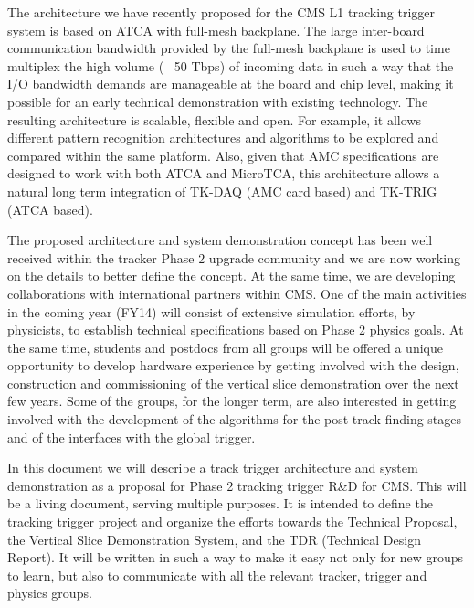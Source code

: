 \noindent The architecture we have recently proposed for the CMS L1 tracking trigger system is based on ATCA with full-mesh backplane. The large inter-board communication bandwidth provided by the full-mesh backplane is used to time multiplex the high volume (~ 50 Tbps) of incoming data in such a way that the I/O bandwidth demands are manageable at the board and chip level, making it possible for an early technical demonstration with existing technology. The resulting architecture is scalable, flexible and open. For example, it allows different pattern recognition architectures and algorithms to be explored and compared within the same platform. Also, given that AMC specifications are designed to work with both ATCA and MicroTCA, this architecture allows a natural long term integration of TK-DAQ (AMC card based) and TK-TRIG (ATCA based).

\noindent The proposed architecture and system demonstration concept has been well received within the tracker Phase 2 upgrade community and we are now working on the details to better define the concept.  At the same time, we are developing collaborations with international partners within CMS. One of the main activities in the coming year (FY14) will consist of extensive simulation efforts, by physicists, to establish technical specifications based on Phase 2 physics goals. At the same time, students and postdocs from all groups will be offered a unique opportunity to develop hardware experience by getting involved with the design, construction and commissioning of the vertical slice demonstration over the next few years. Some of the groups, for the longer term, are also interested in getting involved with the development of the algorithms for the post-track-finding stages and of the interfaces with the global trigger. 

\noindent In this document we will describe a track trigger architecture and system demonstration as a proposal for Phase 2 tracking trigger R\&D for CMS. This will be a living document, serving multiple purposes. It is intended to define the tracking trigger project and organize the efforts towards the Technical Proposal, the Vertical Slice Demonstration System, and the TDR (Technical Design Report). It will be written in such a way to make it easy not only for new groups to learn, but also to communicate with all the relevant tracker, trigger and physics groups.

\clearpage
